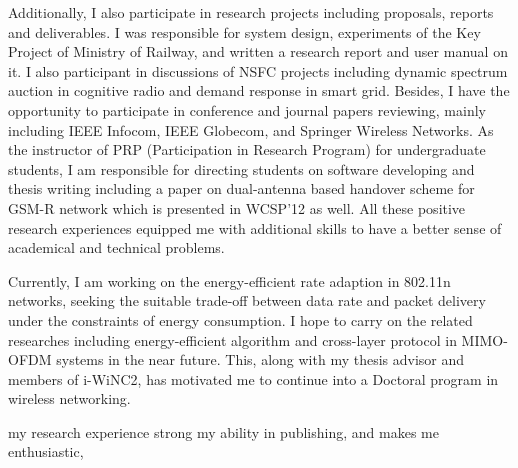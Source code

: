 \documentclass[conference,onecolumn]{IEEEtran}
\begin{document}
Additionally, I also participate in research projects including proposals, reports and deliverables. I was responsible for system design, experiments of the Key Project of Ministry of Railway, and written a research report and user manual on it. I also participant in discussions of NSFC projects including dynamic spectrum auction in cognitive radio and demand response in smart grid. Besides, I have the opportunity to participate in conference and journal papers reviewing, mainly including IEEE Infocom, IEEE Globecom, and Springer Wireless Networks. As the instructor of PRP (Participation in Research Program) for undergraduate students, I am responsible for directing students on software developing and thesis writing including a paper on dual-antenna based handover scheme for GSM-R network which is presented in WCSP'12 as well. All these positive research experiences equipped me with additional skills to have a better sense of academical and technical problems.

Currently, I am working on the energy-efficient rate adaption in 802.11n networks, seeking the suitable trade-off between data rate and packet delivery under the constraints of energy consumption. I hope to carry on the related researches including energy-efficient algorithm and cross-layer protocol in MIMO-OFDM systems in the near future. This, along with my thesis advisor and members of i-WiNC2, has motivated me to continue into a Doctoral program in wireless networking.

my research experience strong my ability in publishing, and makes me enthusiastic,
\end{document}
